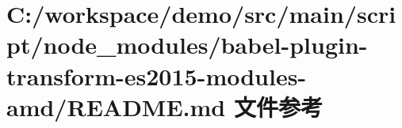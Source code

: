 \hypertarget{node__modules_2babel-plugin-transform-es2015-modules-amd_2_r_e_a_d_m_e_8md}{}\section{C\+:/workspace/demo/src/main/script/node\+\_\+modules/babel-\/plugin-\/transform-\/es2015-\/modules-\/amd/\+R\+E\+A\+D\+ME.md 文件参考}
\label{node__modules_2babel-plugin-transform-es2015-modules-amd_2_r_e_a_d_m_e_8md}
